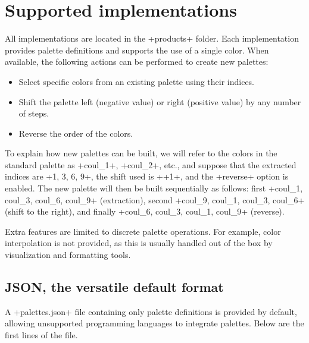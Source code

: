 \documentclass{tutodoc}
\begin{document}

\section{Supported implementations}
\label{products-all}

All implementations are located in the +products+ folder. Each implementation provides palette definitions and supports the use of a single color. When available, the following actions can be performed to create new palettes:

\begin{itemize}
\item
Select specific colors from an existing palette using their indices.

\item
Shift the palette left (negative value) or right (positive value) by any number of steps.

\item
Reverse the order of the colors.
\end{itemize}

\begin{tdocimp}
To explain how new palettes can be built, we will refer to the colors in the standard palette as +coul_1+, +coul_2+, etc., and suppose that the extracted indices are +{1, 3, 6, 9}+, the shift used is ++1+, and the +reverse+ option is enabled. The new palette will then be built sequentially as follows: first +{coul_1, coul_3, coul_6, coul_9}+ (extraction), second +{coul_9, coul_1, coul_3, coul_6}+ (shift to the right), and finally +{coul_6, coul_3, coul_1, coul_9}+ (reverse).
\end{tdocimp}

\begin{tdocnote}
Extra features are limited to discrete palette operations. For example, color interpolation is not provided, as this is usually handled out of the box by visualization and formatting tools.
\end{tdocnote}

\subsection{JSON, the versatile default format}
\label{products-json}

A +palettes.json+ file containing only palette definitions is provided by default, allowing unsupported programming languages to integrate {\thisproj} palettes. Below are the first lines of the file.
\end{document}
